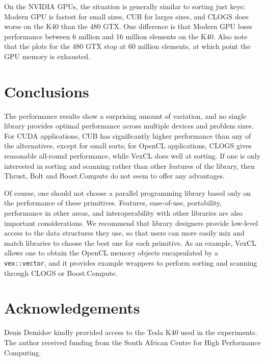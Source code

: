 \documentclass{ws-ppl}
\begin{document}
On the NVIDIA GPUs, the situation is generally similar to sorting just keys:
Modern GPU is fastest for small sizes, CUB for larges sizes, and CLOGS does worse
on the K40 than the 480 GTX. One difference is that Modern GPU loses performance
between 6 million and 16 million elements on the K40. Also note that the plots
for the 480 GTX stop at 60 million elements, at which point the GPU memory is
exhausted.

\section{Conclusions}
The performance results show a surprising amount of variation, and no single
library provides optimal performance across multiple devices and problem
sizes. For CUDA applications, CUB has significantly higher performance than
any of the alternatives, except for small sorts; for OpenCL applications,
CLOGS gives reasonable all-round performance, while VexCL does well at sorting.
If one is only interested in sorting and scanning rather than other features
of the library, then Thrust, Bolt and Boost.Compute do not seem to offer any
advantages.

Of course, one should not choose a parallel programming library based only on
the performance of these primitives. Features, ease-of-use, portability,
performance in other areas, and interoperability with other libraries are also
important considerations.
We recommend that library designers provide low-level access to the data
structures they use, so that users can more easily mix and match libraries to
choose the best one for each primitive. As an example, VexCL allows one to
obtain the OpenCL memory objects encapsulated by a \texttt{vex::vector}, and
it provides example wrappers to perform sorting and scanning through CLOGS or
Boost.Compute.

\section*{Acknowledgements}
Denis Demidov kindly provided access to the Tesla K40 used in the experiments.
The author received funding from the South African Centre for High Performance
Computing.


\end{document}
